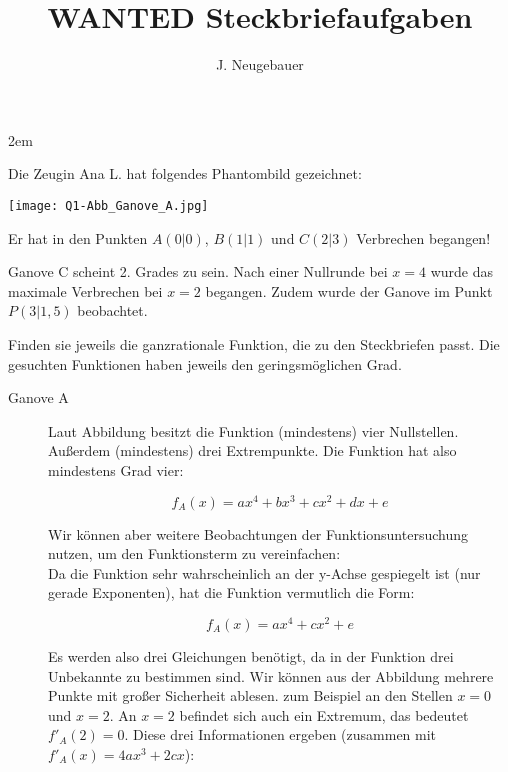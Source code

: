 \documentclass[11pt, a4paper, landscape, twocolumn]{scrartcl}
\author{J. Neugebauer}
\title{WANTED Steckbriefaufgaben}
\date{\Heute}
\begin{document}
	\TITEL
	
	\begin{aufgabe}
		\begin{description}\itemsep 2em
			\item[Ganove A]
			Die Zeugin Ana L. hat folgendes Phantombild gezeichnet:
			\begin{center}
				\texttt{[image: Q1-Abb\_Ganove\_A.jpg]}
			\end{center}
		
			\item[Ganove B]
			Er hat in den Punkten $A(0|0)$, $B(1|1)$ und $C(2|3)$ Verbrechen begangen!
			
			\item[Ganove C]
			Ganove C scheint 2. Grades zu sein. Nach einer Nullrunde bei $x=4$ wurde das
			maximale Verbrechen bei $x=2$ begangen. Zudem wurde der Ganove im Punkt
			$P(3|1,5)$ beobachtet.
		\end{description}
	
		\begin{rahmen}
			Finden sie jeweils die ganzrationale Funktion, die zu den Steckbriefen passt.
			Die gesuchten Funktionen haben jeweils den geringsmöglichen Grad.
		\end{rahmen}
		\bigskip

		\begin{loesung}
			\begin{description}
				\item[Ganove A]
				Laut Abbildung besitzt die Funktion (mindestens) vier Nullstellen. Außerdem (mindestens) drei Extrempunkte. Die Funktion hat also mindestens Grad vier:
				
				\[ f_A(x) = ax^4 + bx^3 + cx^2 + dx + e \]
				
				Wir können aber weitere Beobachtungen der Funktionsuntersuchung nutzen, um den 
				Funktionsterm zu vereinfachen:\\
				Da die Funktion sehr wahrscheinlich an der y-Achse gespiegelt ist (nur gerade Exponenten), 
				hat die Funktion vermutlich die Form:

				\[ f_A(x) = ax^4 + cx^2 + e \]
				
				Es werden also drei Gleichungen benötigt, da in der Funktion drei Unbekannte zu bestimmen sind. Wir können aus der Abbildung mehrere Punkte mit großer Sicherheit ablesen. zum Beispiel an den Stellen $x = 0$ und $x = 2$. An $x = 2$ befindet sich auch ein Extremum, das bedeutet $f'_A(2) = 0$. Diese drei Informationen ergeben (zusammen mit $f'_A(x) = 4ax^3 + 2cx$):
				

\end{description}
\end{loesung}
\end{aufgabe}
\end{document}

